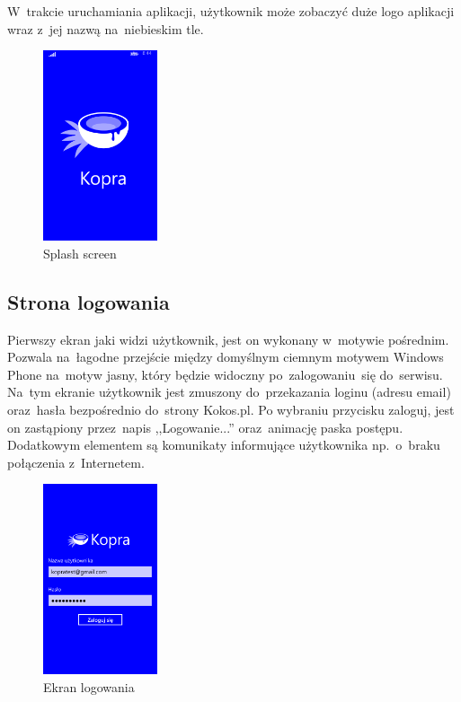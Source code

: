 \documentclass[a4paper,twoside,titlepage,openright]{book}
\begin{document}
W~trakcie uruchamiania aplikacji, użytkownik może zobaczyć duże logo aplikacji wraz z~jej nazwą na~niebieskim tle. 
\begin{figure}[h]
	\begin{minipage}[h]{\textwidth}
		\centering
		\includegraphics[width=0.3\textwidth]{splashScreen.png}
		\caption{Splash screen}
	\end{minipage}
	\hfill
\end{figure}


\subsection{Strona logowania}
Pierwszy ekran jaki widzi użytkownik, jest on wykonany w~motywie pośrednim. Pozwala na~łagodne przejście między domyślnym ciemnym motywem Windows Phone na~motyw jasny, który będzie widoczny po~zalogowaniu~się do~serwisu. Na~tym ekranie użytkownik jest zmuszony do~przekazania loginu (adresu email) oraz~hasła bezpośrednio do~strony Kokos.pl. Po wybraniu przycisku zaloguj, jest on zastąpiony przez~napis ,,Logowanie...'' oraz~animację paska postępu. Dodatkowym elementem są komunikaty informujące użytkownika np.~o~braku połączenia z~Internetem.
\begin{figure}[h]
	\begin{minipage}[h]{\textwidth}
		\centering
		\includegraphics[width=0.3\textwidth]{logowanie.png}
		\caption{Ekran logowania}
	\end{minipage}
	\hfill
\end{figure}
\end{document}
